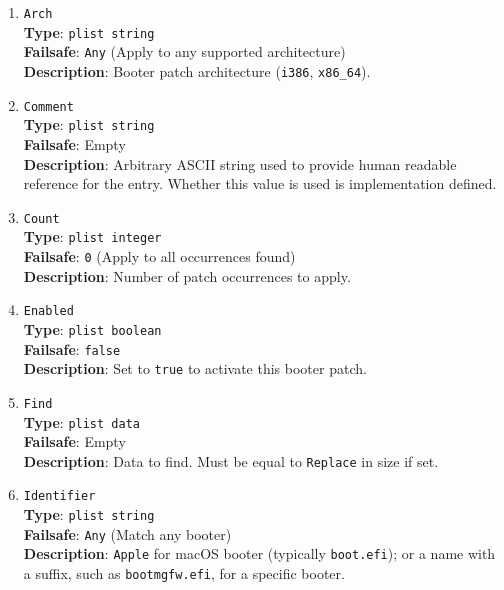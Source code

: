 \documentclass[]{article}
\begin{document}
\begin{enumerate}
\item
  \texttt{Arch}\\
  \textbf{Type}: \texttt{plist\ string}\\
  \textbf{Failsafe}: \texttt{Any} (Apply to any supported architecture)\\
  \textbf{Description}: Booter patch architecture (\texttt{i386}, \texttt{x86\_64}).

\item
  \texttt{Comment}\\
  \textbf{Type}: \texttt{plist\ string}\\
  \textbf{Failsafe}: Empty\\
  \textbf{Description}: Arbitrary ASCII string used to provide human readable
  reference for the entry. Whether this value is used is implementation defined.

\item
  \texttt{Count}\\
  \textbf{Type}: \texttt{plist\ integer}\\
  \textbf{Failsafe}: \texttt{0} (Apply to all occurrences found)\\
  \textbf{Description}: Number of patch occurrences to apply.

\item
  \texttt{Enabled}\\
  \textbf{Type}: \texttt{plist\ boolean}\\
  \textbf{Failsafe}: \texttt{false}\\
  \textbf{Description}: Set to \texttt{true} to activate this booter patch.

\item
  \texttt{Find}\\
  \textbf{Type}: \texttt{plist\ data}\\
  \textbf{Failsafe}: Empty\\
  \textbf{Description}: Data to find. Must be equal to \texttt{Replace} in size if set.

\item
  \texttt{Identifier}\\
  \textbf{Type}: \texttt{plist\ string}\\
  \textbf{Failsafe}:  \texttt{Any} (Match any booter)\\
  \textbf{Description}: \texttt{Apple} for macOS booter (typically \texttt{boot.efi});
  or a name with a suffix, such as \texttt{bootmgfw.efi}, for a specific booter.


\end{enumerate}
\end{document}
